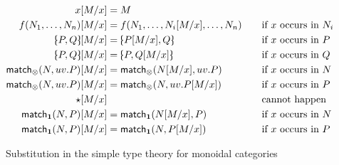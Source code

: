 \begin{figure}
  \centering
  \begin{alignat*}{2}
    x[M/x] &= M\\
    f(N_1,\dots,N_n)[M/x] &= f(N_1,\dots,N_i[M/x],\dots,N_n) &&\quad\text{if $x$ occurs in $N_i$}\\
    \tpair P Q[M/x] &= \tpair{P[M/x]}{Q} &&\quad\text{if $x$ occurs in $P$}\\
    \tpair P Q[M/x] &= \tpair{P}{Q[M/x]} &&\quad\text{if $x$ occurs in $Q$}\\
    \match_\tensor(N,uv.P)[M/x] &= \match_\tensor(N[M/x],uv.P) &&\quad\text{if $x$ occurs in $N$}\\
    \match_\tensor(N,uv.P)[M/x] &= \match_\tensor(N,uv.P[M/x]) &&\quad\text{if $x$ occurs in $P$}\\
    \ott[M/x] &&&\quad\text{cannot happen}\\
    \match_\one(N,P)[M/x] &= \match_\one(N[M/x],P) &&\quad\text{if $x$ occurs in $N$}\\
    \match_\one(N,P)[M/x] &= \match_\one(N,P[M/x]) &&\quad\text{if $x$ occurs in $P$}
  \end{alignat*}
  \caption{Substitution in the simple type theory for monoidal categories}
  \label{fig:moncat-sub}
\end{figure}

